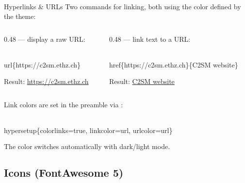 \documentclass[presentation, aspectratio=169]{beamer}
\begin{document}
\begin{frame}[fragile]{Hyperlinks \& URLs}
  Two commands for linking, both using the  color defined by the theme:

  \vspace{0.4em}
  \begin{columns}[t, onlytextwidth]
    \begin{column}{0.48\textwidth}
      \textbf{} --- display a raw URL:
      \vspace{0.3em}
\begin{codeblock}
\\url\{https://c2sm.ethz.ch\}
\end{codeblock}
      \vspace{0.3em}
      Result: \url{https://c2sm.ethz.ch}
    \end{column}
    \begin{column}{0.48\textwidth}
      \textbf{} --- link text to a URL:
      \vspace{0.3em}
\begin{codeblock}
\\href\{https://c2sm.ethz.ch\}\{C2SM website\}
\end{codeblock}
      \vspace{0.3em}
      Result: \href{https://c2sm.ethz.ch}{C2SM website}
    \end{column}
  \end{columns}

  \vspace{0.5em}
  Link colors are set in the preamble via \inlinecode{\\hypersetup}:
\begin{codeblock}
\\hypersetup\{colorlinks=true, linkcolor=url, urlcolor=url\}
\end{codeblock}
  The  color switches automatically with dark/light mode.
\end{frame}

\subsection{Icons (FontAwesome 5)}
\end{document}
